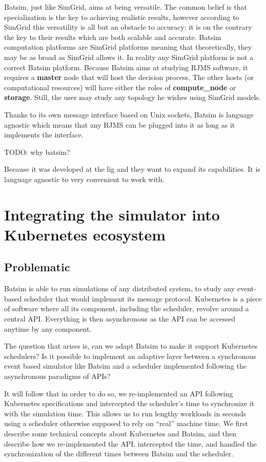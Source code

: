 \documentclass[12pt, a4paper]{memoir}
\begin{document}
Batsim, just like SimGrid, aims at being versatile. The common belief is that
specialization is the key to achieving realistic results, however according to
SimGrid this versatility is all but an obstacle to
accuracy\cite{casanova:hal-01017319}: it is on the contrary the key to their
results which are both scalable and accurate. Batsim computation platforms are
SimGrid platforms meaning that theoretically, they may be as broad as SimGrid
allows it. In reality any SimGrid platform is not a correct Batsim platform.
Because Batsim aims at studying RJMS software, it requires a \textbf{master}
node that will host the decision process. The other hosts (or computational
resources) will have either the roles of \textbf{compute\_node} or
\textbf{storage}. Still, the user may study any topology he wishes using
SimGrid models.

Thanks to its own message interface based on Unix sockets, Batsim is language
agnostic which means that any RJMS can be plugged into it as long as it
implements the interface.

TODO: why batsim?

Because it was developed at the lig and they want to expand its capabilities.
It is language agnostic to very convenient to work with.

\chapter{Integrating the simulator into Kubernetes ecosystem}

\section{Problematic}

Batsim is able to run simulations of any distributed system, to study any
event-based scheduler that would implement its message protocol. Kubernetes is
a piece of software where all its component, including the scheduler, revolve
around a central API. Everything is then asynchronous as the API can be
accessed anytime by any component.

The question that arises is, can we adapt Batsim to make it support Kubernetes
schedulers? Is it possible to implement an adaptive layer between a synchronous
event based simulator like Batsim and a scheduler implemented following the
asynchronous paradigms of APIs?

It will follow that in order to do so, we re-implemented an API following
Kubernetes specifications and intercepted the scheduler's time to
synchronize it with the simulation time. This allows us to run lengthy
workloads in seconds using a scheduler otherwise supposed to rely on ``real''
machine time. We first describe some technical concepts about Kubernetes and
Batsim, and then describe how we re-implemented the API, intercepted the time,
and handled the synchronization of the different times between Batsim and the
scheduler.
\end{document}
